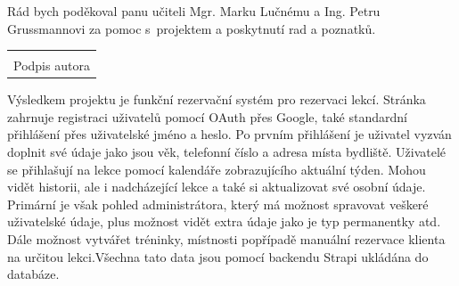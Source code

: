 \documentclass[12pt, a4paper,
openright
]{report}
\newcommand\datumOdevzdani{1. 1. 2025} %
\begin{document}
\clearpage %
	

	
	\noindent Rád bych poděkoval panu učiteli Mgr. Marku Lučnému a Ing. Petru Grussmannovi za pomoc s~projektem a poskytnutí rad a poznatků.
	
	\vspace*{0.7\textheight} %

	\vfill
	\noindent{V Opavě \datumOdevzdani\\}
	\noindent
	\begin{minipage}{\linewidth}
		\hspace{9.5cm} 
		\begin{tabular}{@{}p{6cm}@{}}
			\dotfill \\
			Podpis autora
		\end{tabular}
	\end{minipage}
	
	


	\noindent Výsledkem projektu je funkční rezervační systém pro rezervaci lekcí. Stránka zahrnuje registraci uživatelů pomocí OAuth přes Google, také standardní přihlášení přes uživatelské jméno a heslo. Po prvním přihlášení je uživatel vyzván doplnit své údaje jako jsou věk, telefonní číslo a adresa místa bydliště. Uživatelé se přihlašují na lekce pomocí kalendáře zobrazujícího aktuální týden. Mohou vidět historii, ale i nadcházející lekce a také si aktualizovat své osobní údaje. Primární je však pohled administrátora, který má možnost spravovat veškeré uživatelské údaje, plus možnost vidět extra údaje jako je typ permanentky atd. Dále možnost vytvářet tréninky, místnosti popřípadě manuální rezervace klienta na určitou lekci.Všechna tato data jsou pomocí backendu Strapi ukládána do databáze.\\
	
\end{document}
